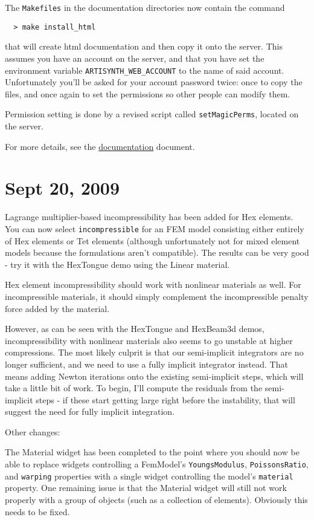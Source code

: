 \documentclass{article}
\begin{document}
The {\tt Makefiles} in the documentation directories now contain the
command

\begin{verbatim}
  > make install_html
\end{verbatim}

that will create html documentation and then copy it onto the
server. This assumes you have an account on the server, and that you
have set the environment variable {\tt ARTISYNTH\_WEB\_ACCOUNT} to the name
of said account. Unfortunately you'll be asked for your account
password twice: once to copy the files, and once again to set the
permissions so other people can modify them.

Permission setting is done by a revised script called {\tt setMagicPerms},
located on the server.

For more details, see the 
\href{../documentation/documentation.html#Installing}{documentation} document.

\section*{Sept 20, 2009}

Lagrange multiplier-based incompressibility has been added for Hex
elements. You can now select {\tt incompressible} for an FEM model
consisting either entirely of Hex elements or Tet elements (although
unfortunately not for mixed element models because the formulations
aren't compatible). The results can be very good - try it with the
HexTongue demo using the Linear material.

Hex element incompressibility should work with nonlinear materials as
well. For incompressible materials, it should simply complement the
incompressible penalty force added by the material.

However, as can be seen with the HexTongue and HexBeam3d demos,
incompressibility with nonlinear materials also seems to go unstable
at higher compressions. The most likely culprit is that our
semi-implicit integrators are no longer sufficient, and we need to use
a fully implicit integrator instead. That means adding Newton
iterations onto the existing semi-implicit steps, which will take a
little bit of work. To begin, I'll compute the residuals from the
semi-implicit steps - if these start getting large right before the
instability, that will suggest the need for fully implicit
integration.

Other changes:

The Material widget has been completed to the point where you should
now be able to replace widgets controlling a FemModel's
{\tt YoungsModulus}, {\tt PoissonsRatio}, and {\tt warping} properties with a
single widget controlling the model's {\tt material} property. One
remaining issue is that the Material widget will still not work
properly with a group of objects (such as a collection of
elements). Obviously this needs to be fixed.
\end{document}

